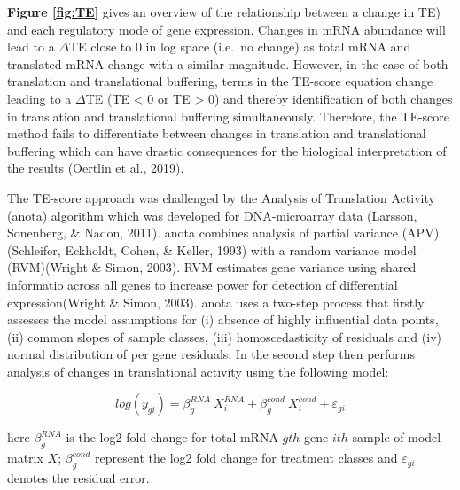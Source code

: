 \documentclass[12pt,openany]{book}
\begin{document}
\textbf{Figure \ref{fig:TE}} gives an overview of the relationship
between a change in TE) and each regulatory mode of gene expression.
Changes in mRNA abundance will lead to a \(\varDelta\)TE close to 0 in
log space (i.e.~no change) as total mRNA and translated mRNA change with
a similar magnitude. However, in the case of both translation and
translational buffering, terms in the TE-score equation change leading
to a \(\varDelta\)TE (TE \textless{} 0 or TE \textgreater{} 0) and
thereby identification of both changes in translation and translational
buffering simultaneously. Therefore, the TE-score method fails to
differentiate between changes in translation and translational buffering
which can have drastic consequences for the biological interpretation of
the results (Oertlin et al., 2019).

The TE-score approach was challenged by the Analysis of Translation
Activity (anota) algorithm which was developed for DNA-microarray data
(Larsson, Sonenberg, \& Nadon, 2011). anota combines analysis of partial
variance (APV)(Schleifer, Eckholdt, Cohen, \& Keller, 1993) with a
random variance model (RVM)(Wright \& Simon, 2003). RVM estimates gene
variance using shared informatio across all genes to increase power for
detection of differential expression(Wright \& Simon, 2003). anota uses
a two-step process that firstly assesses the model assumptions for (i)
absence of highly influential data points, (ii) common slopes of sample
classes, (iii) homoscedasticity of residuals and (iv) normal
distribution of per gene residuals. In the second step then performs
analysis of changes in translational activity using the following model:

\[log(y_{gi}) = \beta_g^{RNA}\ X_i^{RNA}+ \beta_g^{cond}\ X_i^{cond} + \varepsilon_{gi}\]

here \(\beta_g^{RNA}\) is the log2 fold change for total mRNA \(gth\)
gene \(ith\) sample of model matrix \(X\); \(\beta_g^{cond}\) represent
the log2 fold change for treatment classes and \(\varepsilon_{gi}\)
denotes the residual error.
\end{document}
